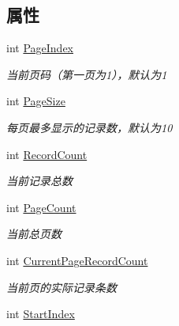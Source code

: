 \subsection*{属性}
\begin{DoxyCompactItemize}
\item 
int \hyperlink{class_x_c_l_net_tools_1_1_entity_1_1_pager_info_a2cd0abb6744c59bbd9b98c758a023ac5}{Page\-Index}
\begin{DoxyCompactList}\small\item\em 当前页码（第一页为1），默认为1 \end{DoxyCompactList}\item 
int \hyperlink{class_x_c_l_net_tools_1_1_entity_1_1_pager_info_af9b5f737263571d79ead065f6faaa5ca}{Page\-Size}
\begin{DoxyCompactList}\small\item\em 每页最多显示的记录数，默认为10 \end{DoxyCompactList}\item 
int \hyperlink{class_x_c_l_net_tools_1_1_entity_1_1_pager_info_a5617d4aaafa80fa664f13cfe7fbc1a6c}{Record\-Count}
\begin{DoxyCompactList}\small\item\em 当前记录总数 \end{DoxyCompactList}\item 
int \hyperlink{class_x_c_l_net_tools_1_1_entity_1_1_pager_info_a986467ea00c659d4c81c036f2bfaa1b9}{Page\-Count}
\begin{DoxyCompactList}\small\item\em 当前总页数 \end{DoxyCompactList}\item 
int \hyperlink{class_x_c_l_net_tools_1_1_entity_1_1_pager_info_ac873f1babc543a806b6ec686bf9fc86a}{Current\-Page\-Record\-Count}
\begin{DoxyCompactList}\small\item\em 当前页的实际记录条数 \end{DoxyCompactList}\item 
int \hyperlink{class_x_c_l_net_tools_1_1_entity_1_1_pager_info_a659b36bf635a3fed41ee3b82ec4c2cbe}{Start\-Index}

\end{DoxyCompactItemize}
